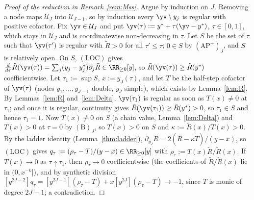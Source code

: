 \begin{proof}[Proof of the reduction in Remark~\textup{\ref{rem:Mss}}]
Argue by induction on $J$. Removing a node maps $\mathcal U_J$ into $\mathcal U_{J-1}$, so by induction every
$\yv\setminus y_j$ is regular with positive cofactor. Fix $\yv\in\mathcal U_J$ and put $\yv(\tau):=y^*+\tau(\yv-y^*)$,
$\tau\in[0,1]$, which stays in $\mathcal U_J$ and is coordinatewise non-decreasing in $\tau$. Let $S$ be the set of
$\tau$ such that $\yv(\tau')$ is regular with $\tilde R>0$ for all $\tau'\le\tau$; $0\in S$ by $(\mathrm{AP}^+)_J$,
and $S$ is relatively open. On $S$, $(\mathrm{LOC})$ gives
$\frac{d}{d\tau}\tilde R(\yv(\tau))=\sum_j(y_j-y_j^*)\partial_j\tilde R\in\RR_{\ge0}[y]$, so
$\tilde R(\yv(\tau))\ge\tilde R(y^*)$ coefficientwise. Let $\tau_1:=\sup S$, $x:=y_J(\tau)$, and let $T$ be the half-step
cofactor of $\yv(\tau)$ (nodes $y_1,\dots,y_{J-1}$ double, $y_J$ simple), which exists by Lemma~\ref{lem:R}. By
Lemmas~\ref{lem:R} and~\ref{lem:Delta}, $\yv(\tau_1)$ is regular as soon as $T(x)\neq0$ at $\tau_1$; and once it is
regular, continuity gives $\tilde R(\yv(\tau_1))\ge\tilde R(y^*)>0$, so $\tau_1\in S$ and hence $\tau_1=1$. Now
$T(x)\neq0$ on $S$ (a chain value, Lemma~\ref{lem:Delta}) and $T(x)>0$ at $\tau=0$ by $(\mathrm B)_J$, so $T(x)>0$ on $S$
and $\kappa:=\tilde R(x)/T(x)>0$. By the ladder identity (Lemma~\ref{thm:ladder}),
$\partial_{y_J}\tilde R=2(\tilde R-\kappa T)/(y-x)$, so $(\mathrm{LOC})$ gives $q_\tau:=(\rho_\tau-T)/(y-x)\in\RR_{\ge0}[y]$
with $\rho_\tau:=T(x)\tilde R/\tilde R(x)$. If $T(x)\to0$ as $\tau\uparrow\tau_1$, then $\rho_\tau\to0$ coefficientwise
(the coefficients of $\tilde R/\tilde R(x)$ lie in $(0,x^{-k}]$), and by synthetic division
$[y^{2J-2}]q_\tau=[y^{2J-1}](\rho_\tau-T)+x[y^{2J}](\rho_\tau-T)\to-1$, since $T$ is monic of degree $2J-1$; a
contradiction.
\end{proof}

